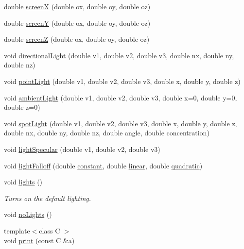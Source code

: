 \begin{DoxyCompactItemize}
double \hyperlink{namespacecprocessing_a8ce792f437aceffc1eb7459593fd2cb0}{screen\-X} (double ox, double oy, double oz)
\item 
double \hyperlink{namespacecprocessing_a52d185d7ceeb94cffe6d9aed57a6aa4d}{screen\-Y} (double ox, double oy, double oz)
\item 
double \hyperlink{namespacecprocessing_a5dbe0a0bd7e63ae17bca9a0a82f1be88}{screen\-Z} (double ox, double oy, double oz)
\item 
void \hyperlink{namespacecprocessing_aa650015d05af290b6a9a84b91f469cfd}{directional\-Light} (double v1, double v2, double v3, double nx, double ny, double nz)
\item 
void \hyperlink{namespacecprocessing_ad96615723c2f0f36a6d2fbff1f136a23}{point\-Light} (double v1, double v2, double v3, double x, double y, double z)
\item 
void \hyperlink{namespacecprocessing_a424650181291261149d18e6422acbacc}{ambient\-Light} (double v1, double v2, double v3, double x=0, double y=0, double z=0)
\item 
void \hyperlink{namespacecprocessing_a73b8403f7fcd2ac084e22361404536ce}{spot\-Light} (double v1, double v2, double v3, double x, double y, double z, double nx, double ny, double nz, double angle, double concentration)
\item 
void \hyperlink{namespacecprocessing_a7c05adc9e787627af3f212ac9e70eed8}{light\-Specular} (double v1, double v2, double v3)
\item 
void \hyperlink{namespacecprocessing_a8d159e7189b41db79ab1b304a10fc8f4}{light\-Falloff} (double \hyperlink{lights_8cpp_a88de168fce6d89f37e5ceff0317b9f06}{constant}, double \hyperlink{lights_8cpp_aa7d568a84fe0f3179836f663743d6be2}{linear}, double \hyperlink{lights_8cpp_a5b54f49bd3fd03eee682575ba830cf99}{quadratic})
\item 
void \hyperlink{namespacecprocessing_ab1acc84389367328f202d254a91f757e}{lights} ()
\begin{DoxyCompactList}\small\item\em \-Turns on the default lighting. \end{DoxyCompactList}\item 
void \hyperlink{namespacecprocessing_a251e268f250938b938ceab16ff97b9a1}{no\-Lights} ()
\item 
{\footnotesize template$<$class C $>$ }\\void \hyperlink{namespacecprocessing_a2ce567d9c23f93c9de2ec5b5b362c750}{print} (const \-C \&a)
\item 

\end{DoxyCompactItemize}
